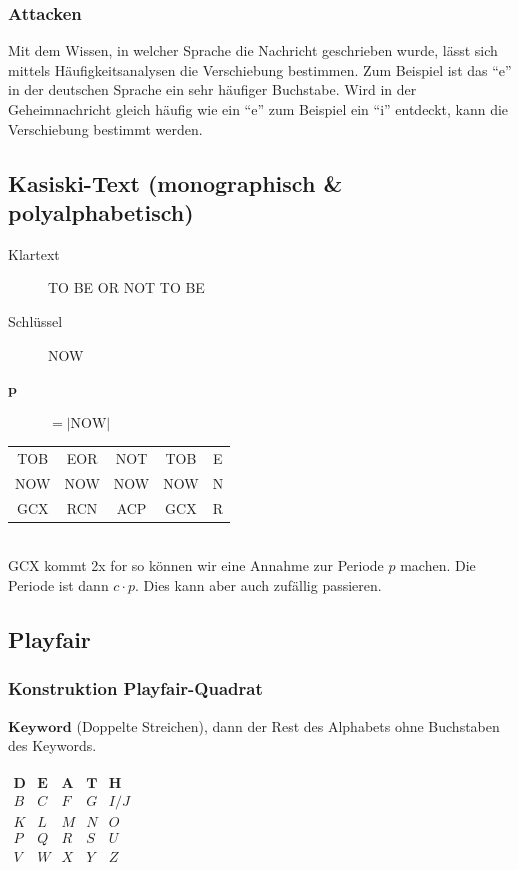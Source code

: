 \documentclass[10pt]{article}
\newcommand{\T}[1]{\text{#1}} %
\newcommand{\Abs}[1]{\left| #1 \right|} %
\begin{document}
\subsubsection{Attacken}
Mit dem Wissen, in welcher Sprache die Nachricht geschrieben wurde, lässt sich mittels Häufigkeitsanalysen die Verschiebung bestimmen. Zum Beispiel ist das ``e'' in der deutschen Sprache ein sehr häufiger Buchstabe. Wird in der Geheimnachricht gleich häufig wie ein ``e'' zum Beispiel ein ``i'' entdeckt, kann die Verschiebung bestimmt werden.

\subsection{Kasiski-Text (monographisch \& polyalphabetisch)}
\begin{description}
	\item[Klartext] TO BE OR NOT TO BE
	\item[Schlüssel] NOW
	\item[$\mathbf{p}$] $=\Abs{\T{NOW}}$
\end{description}
\begin{tabular}{c|c|c|c|c}
 TOB&EOR&NOT&TOB&E\\
 NOW&NOW&NOW&NOW&N\\
 GCX&RCN&ACP&GCX&R
\end{tabular}\\
GCX kommt 2x for so können wir eine Annahme zur Periode $p$ machen. Die Periode ist dann $c\cdot p$. Dies kann aber auch zufällig passieren.

\subsection{Playfair}
\subsubsection{Konstruktion Playfair-Quadrat}
$\mathbf{Keyword}$ (Doppelte Streichen), dann der Rest des Alphabets ohne Buchstaben des Keywords.\\\\
$\begin{matrix}
\mathbf{D} & \mathbf{E} & \mathbf{A} & \mathbf{T} & \mathbf{H} \\
B & C & F & G & I/J \\
K & L & M & N & O \\
P & Q & R & S & U \\
V & W & X & Y & Z \\
\end{matrix}$
\end{document}
